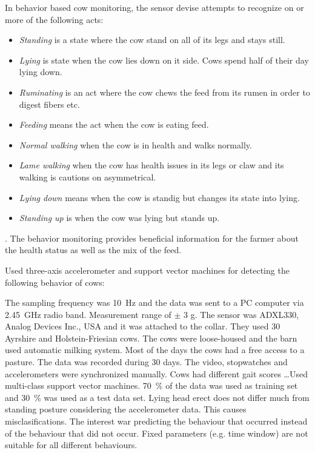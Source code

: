 \documentclass[english,12pt,a4paper,pdftex,elec,utf8]{aaltothesis}
\begin{document}
In behavior based cow monitoring, the sensor devise attempts to recognize on or more of the following acts:

\begin{itemize}
\item \textit{Standing} is a state where the cow stand on all of its legs and stays still.
\item \textit{Lying} is state when the cow lies down on it side. Cows spend half of their day lying down.
\item \textit{Ruminating} is an act where the cow chews the feed from its rumen in order to digest fibers etc.
\item \textit{Feeding} means the act when the cow is eating feed.
\item \textit{Normal walking} when the cow is in health and walks normally.
\item \textit{Lame walking} when the cow has health issues in its legs or claw and its walking is cautions on asymmetrical.
\item \textit{Lying down} means when the cow is standig but changes its state into lying.
\item \textit{Standing up} is when the cow was lying but stands up.
\end{itemize}. The behavior monitoring provides beneficial information for the farmer about the health status as well as the mix of the feed.

Used three-axis accelerometer and support vector machines for detecting the following behavior of cows:

The sampling frequency was \SI{10}{\hertz} and the data was sent to a PC computer via \SI{2.45}{\giga\hertz} radio band. Measurement range of $\pm$ 3 g. The sensor was ADXL330, Analog Devices Inc., USA and it was attached to the collar. They used 30 Ayrshire and Holstein-Friesian cows. The cows were loose-housed and the barn used automatic milking system. Most of the days the cows had a free access to a pasture. The data was recorded during 30 days. The video, stopwatches and accelerometers were synchronized manually. Cows had different gait scores \dots Used multi-class support vector machines. \SI{70}{\percent} of the data was used as training set and \SI{30}{\percent} was used as a test data set. Lying head erect does not differ much from standing posture considering the accelerometer data. This causes misclasifications. The interest war predicting the behaviour that occurred instead of the behaviour that did not occur. Fixed parameters (e.g. time window) are not suitable for all different behaviours. \cite{Martiskainen200932} \\
\end{document}
